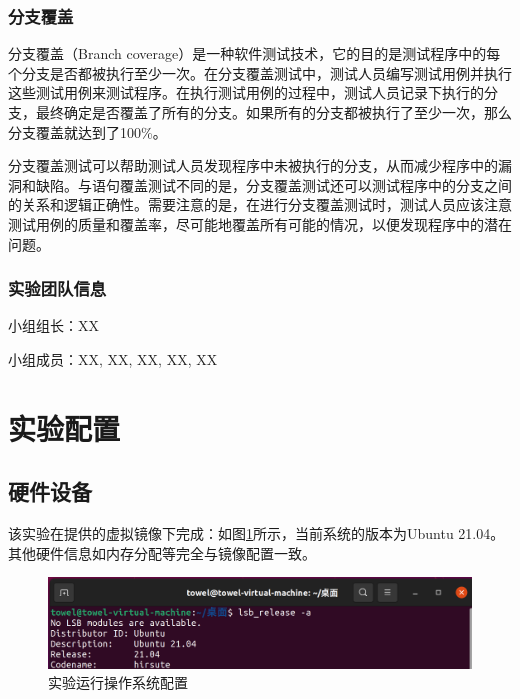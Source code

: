 \documentclass[12pt, a4paper, oneside,bibend=bibtex]{ctexart}
\begin{document}
\subsubsection{分支覆盖}
分支覆盖（Branch coverage）是一种软件测试技术，它的目的是测试程序中的每个分支是否都被执行至少一次。在分支覆盖测试中，测试人员编写测试用例并执行这些测试用例来测试程序。在执行测试用例的过程中，测试人员记录下执行的分支，最终确定是否覆盖了所有的分支。如果所有的分支都被执行了至少一次，那么分支覆盖就达到了100\%。

分支覆盖测试可以帮助测试人员发现程序中未被执行的分支，从而减少程序中的漏洞和缺陷。与语句覆盖测试不同的是，分支覆盖测试还可以测试程序中的分支之间的关系和逻辑正确性。需要注意的是，在进行分支覆盖测试时，测试人员应该注意测试用例的质量和覆盖率，尽可能地覆盖所有可能的情况，以便发现程序中的潜在问题。
\subsubsection{实验团队信息}
小组组长：XX

小组成员：XX, XX, XX, XX, XX
\section{实验配置}




\subsection{硬件设备} 
该实验在提供的虚拟镜像下完成：如图\ref{硬件}所示，当前系统的版本为Ubuntu 21.04。其他硬件信息如内存分配等完全与镜像配置一致。
\begin{figure}[htbp]
    \centering
    \includegraphics[width=0.9\linewidth]{images/hardware.png}
    \caption{实验运行操作系统配置}
    \label{硬件}
\end{figure}
\end{document}
